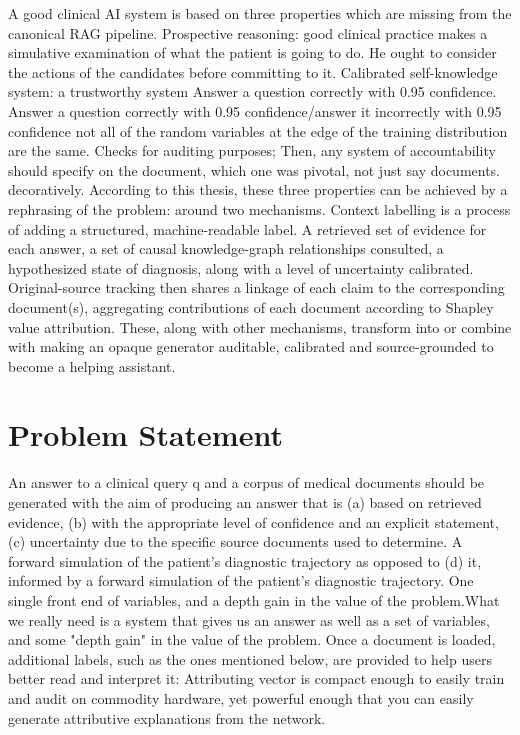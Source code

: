 A good clinical AI system is based on three properties which are missing from the canonical RAG pipeline. Prospective reasoning: good clinical practice makes a simulative examination of what the patient is going to do. He ought to consider the actions of the candidates before committing to it. Calibrated self-knowledge system: a trustworthy system Answer a question correctly with 0.95 confidence. Answer a question correctly with 0.95 confidence/answer it incorrectly with 0.95 confidence not all of the random variables at the edge of the training distribution are the same. Checks for auditing purposes; Then, any system of accountability should specify on the document, which one was pivotal, not just say documents. decoratively.
According to this thesis, these three properties can be achieved by a rephrasing of the problem: around two mechanisms. Context labelling is a process of adding a structured, machine-readable label. A retrieved set of evidence for each answer, a set of causal knowledge-graph relationships consulted, a hypothesized state of diagnosis, along with a level of uncertainty calibrated. Original-source tracking then shares a linkage of each claim to the corresponding document(s), aggregating contributions of each document according to Shapley value attribution. These, along with other mechanisms, transform into or combine with making an opaque generator auditable, calibrated and source-grounded to become a helping assistant.


\section{Problem Statement}

An answer to a clinical query q and a corpus of medical documents should be generated with the aim of producing an answer that
is (a) based on retrieved evidence, (b) with the appropriate level of confidence and an explicit statement,(c) uncertainty due to the specific source documents used to determine.
A forward simulation of the patient's diagnostic trajectory as opposed to (d) it, informed by a forward simulation of the patient's diagnostic trajectory.
One single front end of variables, and a depth gain in the value of the problem.What we really need is a system that gives us an answer as well as a set of variables, and some "depth gain" in the value of the problem.
Once a document is loaded, additional labels, such as the ones mentioned below, are provided to help users better read and interpret it:
Attributing vector is compact enough to easily train and audit on commodity hardware, yet powerful enough that you can easily generate attributive explanations from the network.


